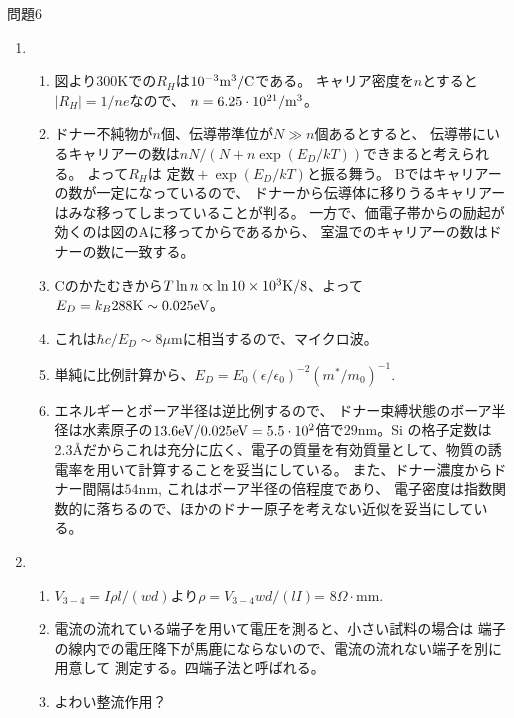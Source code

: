 \documentclass[fleqn]{jbook}
\begin{document}
\begin{answer}{問題6}{}

\begin{enumerate}
\item 
\begin{enumerate}
\item 図より300Kでの$R_H$は$10^{-3}\hbox{m}^3/\hbox{C}$である。
キャリア密度を$n$とすると$|R_H|=1/ne$なので、
$n=6.25\cdot10^{21}/\hbox{m}^3$。
\item 
ドナー不純物が$n$個、伝導帯準位が$N\gg n$個あるとすると、
伝導帯にいるキャリアーの数は$nN/(N+n\exp({E_D/kT}))$できまると考えられる。
よって$R_H$は $定数+\exp(E_D/kT)$と振る舞う。
Bではキャリアーの数が一定になっているので、
ドナーから伝導体に移りうるキャリアーはみな移ってしまっていることが判る。
一方で、価電子帯からの励起が効くのは図のAに移ってからであるから、
室温でのキャリアーの数はドナーの数に一致する。
\item Cのかたむきから$T \ln n\propto \ln 10\times 10^3\hbox{K} /8 $、よって
$E_D=k_B 288\hbox{K}\sim0.025\hbox{eV}$。
\item これは$\hbar c/E_D\sim8\mu$mに相当するので、マイクロ波。
\item 単純に比例計算から、$E_D=E_0(\epsilon/\epsilon_0)^{-2}(m^*/m_0)^{-1}$.
\item エネルギーとボーア半径は逆比例するので、
ドナー束縛状態のボーア半径は水素原子の$13.6\hbox{eV}/0.025\hbox{eV}=5.5\cdot 10^2$倍で$29$nm。Si の格子定数は2.3\AA だからこれは充分に広く、電子の質量を有効質量として、物質の誘電率を用いて計算することを妥当にしている。
また、ドナー濃度からドナー間隔は$54$nm, これはボーア半径の倍程度であり、
電子密度は指数関数的に落ちるので、ほかのドナー原子を考えない近似を妥当にしている。
\end{enumerate}
\item 
\begin{enumerate}
\item $V_{3-4}=I\rho l/(wd)$より$\rho=V_{3-4}wd/(lI)$= $8\Omega\cdot $mm.
\item 電流の流れている端子を用いて電圧を測ると、小さい試料の場合は
端子の線内での電圧降下が馬鹿にならないので、電流の流れない端子を別に用意して
測定する。四端子法と呼ばれる。
\item よわい整流作用？
\end{enumerate}
\end{enumerate}
\end{answer}
\end{document}
